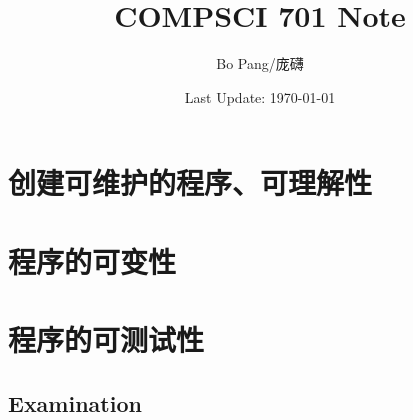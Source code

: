 \documentclass[]{ctexbook}
\title{COMPSCI 701 Note}
\author{Bo Pang/庞礴}
\date{Last Update: \today}
\begin{document}
\maketitle
\tableofcontents

\part{创建可维护的程序、可理解性}















\part{程序的可变性}



\part{程序的可测试性}


\chapter{Examination}



\end{document}

